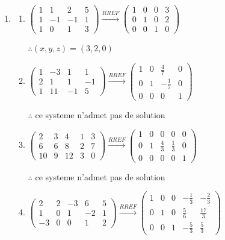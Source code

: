 \documentclass[12pt, a4paper]{article}
\begin{document}
\begin{enumerate}[label=3.\arabic*., start=25]
  \item \begin{enumerate}[\arabic*.]
      \item $\left(\begin{array}{cccc} 1 & 1 & 2 & 5\\ 1 & -1 & -1 & 1\\ 1 & 0 & 1 & 3 \end{array}\right) \xrightarrow{RREF} \left(\begin{array}{cccc} 1 & 0 & 0 & 3\\ 0 & 1 & 0 & 2\\ 0 & 0 & 1 & 0 \end{array}\right)$
        
        $\therefore (x, y, z) = (3, 2, 0)$ 

      \item $\left(\begin{array}{cccc} 1 & -3 & 1 & 1\\ 2 & 1 & 1 & -1\\ 1 & 11 & -1 & 5 \end{array}\right) \xrightarrow{RREF} \left(\begin{array}{cccc} 1 & 0 & \frac{4}{7} & 0\\ 0 & 1 & -\frac{1}{7} & 0\\ 0 & 0 & 0 & 1 \end{array}\right)$
        
        $\therefore$ ce systeme n'admet pas de solution 

      \item $\left(\begin{array}{ccccc} 2 & 3 & 4 & 1 & 3\\ 6 & 6 & 8 & 2 & 7\\ 10 & 9 & 12 & 3 & 0 \end{array}\right) \xrightarrow{RREF} \left(\begin{array}{ccccc} 1 & 0 & 0 & 0 & 0\\ 0 & 1 & \frac{4}{3} & \frac{1}{3} & 0\\ 0 & 0 & 0 & 0 & 1 \end{array}\right)$
        
        $\therefore$ ce systeme n'admet pas de solution 

      \item $\left(\begin{array}{ccccc} 2 & 2 & -3 & 6 & 5\\ 1 & 0 & 1 & -2 & 1\\ -3 & 0 & 0 & 1 & 2 \end{array}\right) \xrightarrow{RREF} \left(\begin{array}{ccccc} 1 & 0 & 0 & -\frac{1}{3} & -\frac{2}{3}\\ 0 & 1 & 0 & \frac{5}{6} & \frac{17}{3}\\ 0 & 0 & 1 & -\frac{5}{3} & \frac{5}{3} \end{array}\right)$


\end{enumerate}
\end{enumerate}
\end{document}
